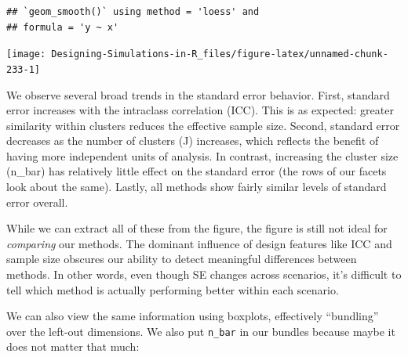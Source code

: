 \documentclass[
]{book}
\newenvironment{Shaded}{\begin{snugshade}}{\end{snugshade}}
\newcommand{\AttributeTok}[1]{\textcolor[rgb]{0.13,0.29,0.53}{#1}}
\newcommand{\ConstantTok}[1]{\textcolor[rgb]{0.56,0.35,0.01}{#1}}
\newcommand{\FloatTok}[1]{\textcolor[rgb]{0.00,0.00,0.81}{#1}}
\newcommand{\FunctionTok}[1]{\textcolor[rgb]{0.13,0.29,0.53}{\textbf{#1}}}
\newcommand{\NormalTok}[1]{#1}
\newcommand{\SpecialCharTok}[1]{\textcolor[rgb]{0.81,0.36,0.00}{\textbf{#1}}}
\begin{document}
\begin{verbatim}
## `geom_smooth()` using method = 'loess' and
## formula = 'y ~ x'
\end{verbatim}

\begin{center}\texttt{[image: Designing-Simulations-in-R\_files/figure-latex/unnamed-chunk-233-1]} \end{center}

We observe several broad trends in the standard error behavior.
First, standard error increases with the intraclass correlation (ICC).
This is as expected: greater similarity within clusters reduces the effective sample size.
Second, standard error decreases as the number of clusters (J) increases, which reflects the benefit of having more independent units of analysis.
In contrast, increasing the cluster size (n\_bar) has relatively little effect on the standard error (the rows of our facets look about the same).
Lastly, all methods show fairly similar levels of standard error overall.

While we can extract all of these from the figure, the figure is still not ideal for \emph{comparing} our methods.
The dominant influence of design features like ICC and sample size obscures our ability to detect meaningful differences between methods.
In other words, even though SE changes across scenarios, it's difficult to tell which method is actually performing better within each scenario.

We can also view the same information using boxplots, effectively ``bundling'' over the left-out dimensions.
We also put \texttt{n\_bar} in our bundles because maybe it does not matter that much:

\begin{Shaded}
\end{Shaded}
\end{document}

